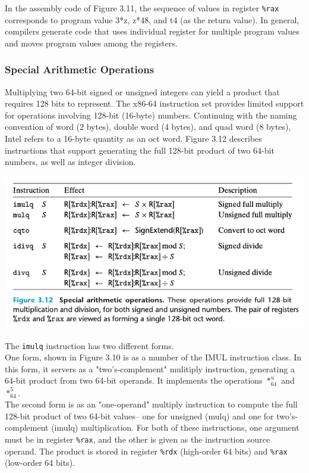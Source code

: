 \documentclass[11pt]{article}
\begin{document}
In the assembly code of Figure 3.11, the sequence of values in register \texttt{\%rax} corresponds to program value 3*z, z*48, and t4 (as the return value). In general, compilers generate code that uses individual register for multiple program values and moves program values among the registers.\\

\subsubsection{Special Arithmetic Operations}
\label{sec:org421bea1}
Multiplying two 64-bit signed or unsigned integers can yield a product that requires 128 bits to represent. The x86-64 instruction set provides limited support for operations involving 128-bit (16-byte) numbers. Continuing with the naming convention of word (2 bytes), double word (4 bytes), and quad word (8 bytes), Intel refers to a 16-byte quantity as an oct word. Figure 3.12 describes instructions that support generating the full 128-bit product of two 64-bit numbers, as well as integer division.\\

\begin{center}
\includegraphics[width=.9\linewidth]{pics/special-arithmetic-operations.png}
\end{center}


The \texttt{imulq} instruction has two different forms.\\
One form, shown in Figure 3.10 is as a mumber of the IMUL instruction class. In this form, it servers as a "two's-complement" mulitiply instruction, generating a 64-bit product from two 64-bit operands. It implements the operations \(*_{64}^u\) and \(*_{64}^5\).\\
The second form is as an "one-operand" multiply instruction to compute the full 128-bit product of two 64-bit values-- one for unsigned (mulq) and one for two's-complement (imulq) multiplication. For both of these instructions, one argument must be in register \texttt{\%rax}, and the other is given as the instruction source operand. The product is stored in register \texttt{\%rdx} (high-order 64 bits) and \texttt{\%rax} (low-order 64 bits).\\
\end{document}
